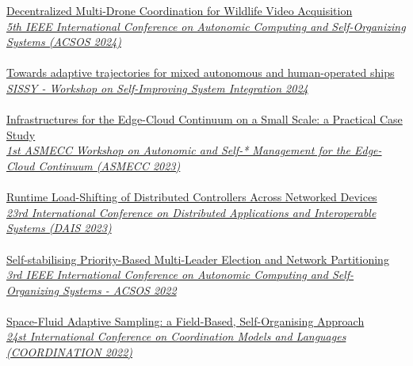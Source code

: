 \href{hhttps://danysk.github.io/slides-2024-acsos-imageonomics/}{Decentralized Multi-Drone Coordination for Wildlife Video Acquisition} \\
\href{https://2024.acsos.org/details/acsos-2024-papers/7/Decentralized-Multi-Drone-Coordination-for-Wildlife-Video-Acquisition}{\textit{5th IEEE International Conference on Autonomic Computing and Self-Organizing Systems (ACSOS 2024)}}
\\ \halfblankline \\
\href{https://www.slideshare.net/slideshow/towards-adaptive-trajectories-for-mixed-autonomous-and-human-operated-ships/271897889}{Towards adaptive trajectories for mixed autonomous and human-operated ships} \\
\href{https://2024.acsos.org/details/acsos-2024-workshops/13/Towards-adaptive-trajectories-for-mixed-autonomous-and-human-operated-ships/}{\textit{SISSY - Workshop on Self-Improving System Integration 2024}}
\\ \halfblankline \\
\href{https://danysk.github.io/slides-2023-asmecc/}{Infrastructures for the Edge-Cloud Continuum on a Small Scale: a Practical Case Study} \\
\href{https://asmecc-workshop.github.io/2023/}{\textit{1st ASMECC Workshop on Autonomic and Self-* Management for the Edge-Cloud Continuum (ASMECC 2023)}}
\\ \halfblankline \\
\href{https://danysk.github.io/slides-2023-dais-loadshift/}{Runtime Load-Shifting of Distributed Controllers Across Networked Devices} \\
\href{https://www.discotec.org/2023/dais.html}{\textit{23rd International Conference on Distributed Applications and Interoperable Systems (DAIS 2023)}}
\\ \halfblankline \\
\href{https://danysk.github.io/Slides-2022-ACSOS-BoundedElection/}{Self-stabilising Priority-Based Multi-Leader Election and Network Partitioning} \\
\href{https://2022.acsos.org/}{\textit{3rd IEEE International Conference on Autonomic Computing and Self-Organizing Systems - ACSOS 2022}}
\\ \halfblankline \\
\href{https://danysk.github.io/Slides-2022-Coordination-SpaceFluid/}{Space-Fluid Adaptive Sampling: a Field-Based, Self-Organising Approach} \\
\href{https://danysk.github.io/Slides-2022-Coordination-SpaceFluid/}{\textit{24st International Conference on Coordination Models and Languages (COORDINATION 2022)}}
